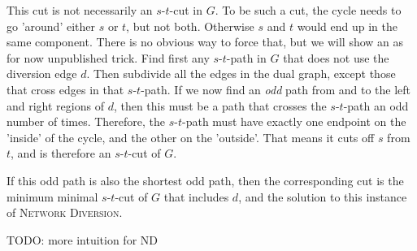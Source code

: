 This cut is not necessarily an $s$-$t$-cut in $G$. To be such a cut, the cycle needs to go 'around' either $s$ or $t$, but not both. Otherwise $s$ and $t$ would end up in the same component. There is no obvious way to force that, but we will show an as for now unpublished trick. Find first any $s$-$t$-path in $G$ that does not use the diversion edge $d$. Then subdivide all the edges in the dual graph, except those that cross edges in that $s$-$t$-path. If we now find an \emph{odd} path from and to the left and right regions of $d$, then this must be a path that crosses the $s$-$t$-path an odd number of times. Therefore, the $s$-$t$-path must have exactly one endpoint on the 'inside' of the cycle, and the other on the 'outside'. That means it cuts off $s$ from $t$, and is therefore an $s$-$t$-cut of $G$. 

If this odd path is also the shortest odd path, then the corresponding cut is the minimum minimal $s$-$t$-cut of $G$ that includes $d$, and the solution to this instance of \textsc{Network Diversion}.

TODO: more intuition for ND